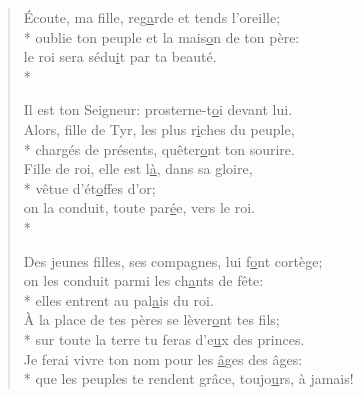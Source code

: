 \begin{verse}
Écoute, ma fille, reg\underline{a}rde et tends l’oreille; \\*
oublie ton peuple et la mais\underline{o}n de ton père: \\
le roi sera sédu\underline{i}t par ta beauté. \\*

Il est ton Seigneur: prosterne-t\underline{o}i devant lui. \\
Alors, fille de Tyr, les plus r\underline{i}ches du peuple, \\*
chargés de présents, quêter\underline{o}nt ton sourire. \\

Fille de roi, elle est l\underline{à}, dans sa gloire, \\*
vêtue d’ét\underline{o}ffes d’or; \\
on la conduit, toute par\underline{é}e, vers le roi. \\*

Des jeunes filles, ses compagnes, lui f\underline{o}nt cortège; \\
on les conduit parmi les ch\underline{a}nts de fête: \\*
elles entrent au pal\underline{a}is du roi. \\

À la place de tes pères se lèver\underline{o}nt tes fils; \\*
sur toute la terre tu feras d’e\underline{u}x des princes. \\

Je ferai vivre ton nom pour les \underline{â}ges des âges: \\*
que les peuples te rendent grâce, toujo\underline{u}rs, à jamais! \\
\end{verse}

